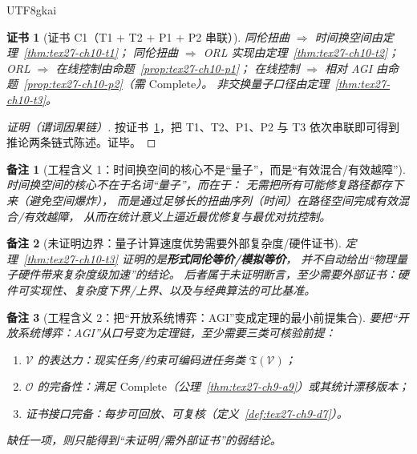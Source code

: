 \documentclass[12pt]{article}
\newtheorem{remark}{备注}[section]
\newtheorem{Certificate}{证书}[section]
\begin{document}
\begin{CJK*}{UTF8}{gkai}
\begin{Certificate}[证书 C1（T1 + T2 + P1 + P2 串联）]
\label{cert:tex27-ch10-c1}
同伦扭曲 $\Rightarrow$ 时间换空间由定理~\ref{thm:tex27-ch10-t1}；
同伦扭曲 $\Rightarrow$ ORL 实现由定理~\ref{thm:tex27-ch10-t2}；
ORL $\Rightarrow$ 在线控制由命题~\ref{prop:tex27-ch10-p1}；
在线控制 $\Rightarrow$ 相对 AGI 由命题~\ref{prop:tex27-ch10-p2}（需 $\mathrm{Complete}$）。
非交换量子口径由定理~\ref{thm:tex27-ch10-t3}。
\end{Certificate}

\begin{proof}[证明（谓词因果链）]
按证书~\ref{cert:tex27-ch10-c1}，把 T1、T2、P1、P2 与 T3 依次串联即可得到推论两条链式陈述。证毕。
\end{proof}

\begin{remark}[工程含义 1：时间换空间的核心不是“量子”，而是“有效混合/有效越障”]
\label{rem:tex27-ch10-r1}
时间换空间的核心不在于名词“量子”，而在于：
无需把所有可能修复路径都存下来（避免空间爆炸），
而是通过足够长的扭曲序列（时间）在路径空间完成有效混合/有效越障，
从而在统计意义上逼近最优修复与最优对抗控制。
\end{remark}

\begin{remark}[未证明边界：量子计算速度优势需要外部复杂度/硬件证书]
\label{rem:tex27-ch10-r2}
定理~\ref{thm:tex27-ch10-t3} 证明的是\textbf{形式同伦等价/模拟等价}，
并不自动给出“物理量子硬件带来复杂度级加速”的结论。
后者属于未证明断言，至少需要外部证书：硬件可实现性、复杂度下界/上界、以及与经典算法的可比基准。
\end{remark}

\begin{remark}[工程含义 2：把“开放系统博弈：AGI”变成定理的最小前提集合]
\label{rem:tex27-ch10-r3}
要把“开放系统博弈：AGI”从口号变为定理链，至少需要三类可核验前提：
\begin{enumerate}
  \item $\mathcal{V}$ 的表达力：现实任务/约束可编码进任务类 $\mathfrak{T}(\mathcal{V})$；
  \item $\mathcal{O}$ 的完备性：满足 $\mathrm{Complete}$（公理~\ref{thm:tex27-ch9-a9}）或其统计漂移版本；
  \item 证书接口完备：每步可回放、可复核（定义~\ref{def:tex27-ch9-d7}）。
\end{enumerate}
缺任一项，则只能得到“未证明/需外部证书”的弱结论。
\end{remark}


\end{CJK*}
\end{document}
